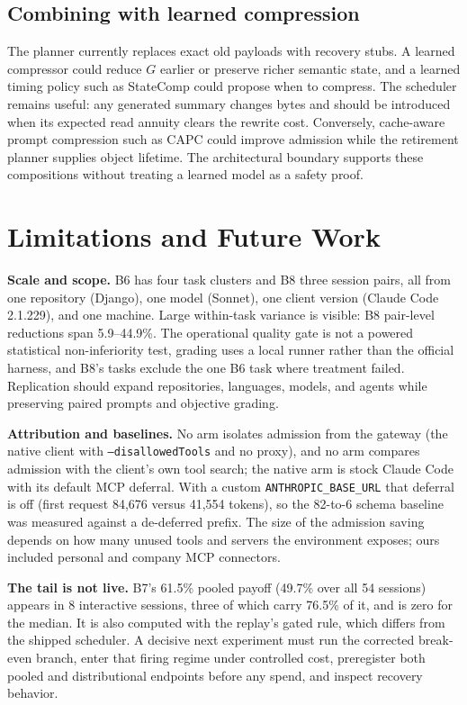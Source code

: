 \documentclass[10pt,twocolumn]{article}
\begin{document}
\subsection{Combining with learned compression}

The planner currently replaces exact old payloads with recovery stubs.  A learned compressor could
reduce $G$ earlier or preserve richer semantic state, and a learned timing policy such as StateComp
\cite{wang2026statecomp} could propose when to compress.  The scheduler remains useful: any generated
summary changes bytes and should be introduced when its expected read annuity clears the rewrite cost.
Conversely, cache-aware prompt compression such as CAPC \cite{song2026capc} could improve admission
while the retirement planner supplies object lifetime.  The architectural boundary supports these
compositions without treating a learned model as a safety proof.

\section{Limitations and Future Work}

\textbf{Scale and scope.}  B6 has four task clusters and B8 three session pairs, all from one
repository (Django), one model (Sonnet), one client version (Claude Code 2.1.229), and one machine.
Large within-task variance is visible: B8 pair-level reductions span 5.9--44.9\%.  The operational
quality gate is not a powered statistical non-inferiority test, grading uses a local runner rather than
the official harness, and B8's tasks exclude the one B6 task where treatment failed.  Replication should
expand repositories, languages, models, and agents while preserving paired prompts and objective
grading.

\textbf{Attribution and baselines.}  No arm isolates admission from the gateway (the native client
with \texttt{--disallowedTools} and no proxy), and no arm compares admission with the client's own tool
search; the native arm is stock Claude Code with its default MCP deferral.  With a custom
\texttt{ANTHROPIC\_BASE\_URL} that deferral is off (first request 84,676 versus 41,554 tokens), so the
82-to-6 schema baseline was measured against a de-deferred prefix.  The size of the admission saving
depends on how many unused tools and servers the environment exposes; ours included personal and
company MCP connectors.

\textbf{The tail is not live.}  B7's 61.5\% pooled payoff (49.7\% over all 54 sessions) appears in 8 interactive sessions,
three of which carry 76.5\% of it, and is zero for the median.  It is also computed with the replay's
gated rule, which differs from the shipped scheduler.  A decisive next experiment must run the corrected
break-even branch, enter that firing regime under controlled cost,
preregister both pooled and distributional endpoints before any spend, and inspect recovery behavior.
\end{document}
